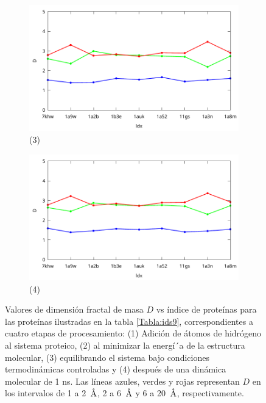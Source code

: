 \begin{figure}[H]
		\begin{subfigure}{0.49\textwidth}
			\centering
			\includegraphics[width=\linewidth,page=1]{graphs/PDBs/Dvsldx/DvsEq.pdf}
			\caption{(3)}
		\end{subfigure}
		\hfill
		\begin{subfigure}{0.49\textwidth}
			\centering
			\includegraphics[width=\linewidth,page=1]{graphs/PDBs/Dvsldx/DvsDm.pdf}
			\caption{(4)}
		\end{subfigure}
		
		\caption{Valores de dimensi\'{o}n fractal de masa $D$ vs \'{i}ndice de prote\'{i}nas para las prote\'{i}nas ilustradas en la tabla \ref{Tabla:ids9}, correspondientes a cuatro etapas de procesamiento: (1) Adici\'{o}n de \'{a}tomos de hidr\'{o}geno al sistema proteico, (2) al minimizar la energ\'{i´}a de la estructura molecular, (3) equilibrando el sistema bajo condiciones termodin\'{a}micas controladas y (4) despu\'{e}s de una din\'{a}mica molecular de 1 ns. Las líneas azules, verdes y rojas representan $D$ en los intervalos de 1 a 2~$\textup{\r{A}}$, 2 a 6~$\textup{\r{A}}$ y 6 a 20~$\textup{\r{A}}$, respectivamente.}
		\label{fig:Df-general}
	\end{figure}
	

